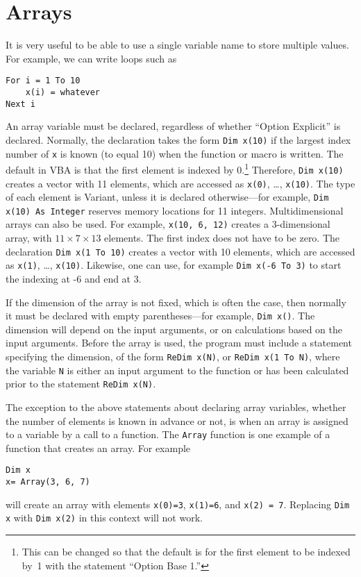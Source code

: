 {\section{Arrays}

It is very useful to be able to use a single variable name to store multiple values.  For example, we can write loops such as
\small\begin{verbatim}
For i = 1 To 10
    x(i) = whatever
Next i
\end{verbatim}\normalsize
An array variable must be declared, regardless of whether ``Option Explicit'' is declared.  Normally, the declaration takes the form \verb!Dim x(10)! if the largest index number of \verb!x! is known (to equal 10) when the function or macro is written.  The default in VBA is that the first element is indexed by 0.\footnote{This can be changed so that the default is for the first element to be indexed by~1 with the statement ``Option Base 1.''} Therefore, \verb!Dim x(10)! creates a vector with 11 elements, which are accessed as \verb!x(0)!, \ldots, \verb!x(10)!.  The type of each element is Variant, unless it is declared otherwise---for example, \verb!Dim x(10) As Integer! reserves memory locations for 11 integers.
Multidimensional arrays can also be used.  For example, \verb!x(10, 6, 12)! creates a 3-dimensional array, with $11 \times 7 \times 13$ elements.  The first index does not have to be zero.  The declaration \verb!Dim x(1 To 10)! creates a vector with 10 elements, which are accessed as \verb!x(1)!, \ldots, \verb!x(10)!.  Likewise, one can use, for example \verb!Dim x(-6 To 3)!  to start the indexing at -6 and end at 3.

If the dimension of the array is not fixed, which is often the case, then normally it must be declared with empty parentheses---for example, \verb!Dim x()!.    The dimension will depend on the input arguments, or on calculations based on the input arguments.  Before the array is used, the program must include a statement specifying the dimension, of the form \verb!ReDim x(N)!, or \verb!ReDim x(1 To N)!, where the variable \verb!N! is either an input argument to the function or has been calculated prior to the statement \verb!ReDim x(N)!.

The exception to the above statements about declaring array variables, whether the number of elements is known in advance or not, is when an array is assigned to a variable by a call to a function.  The \verb!Array! function is one example of a function that creates an array.  For example
\small\begin{verbatim}
Dim x
x= Array(3, 6, 7)
\end{verbatim}\normalsize
will create an array with elements \verb!x(0)=3!, \verb!x(1)=6!, and \verb!x(2) = 7!.  Replacing \verb!Dim x! with  \verb!Dim x(2)! in this context will not work.


}

